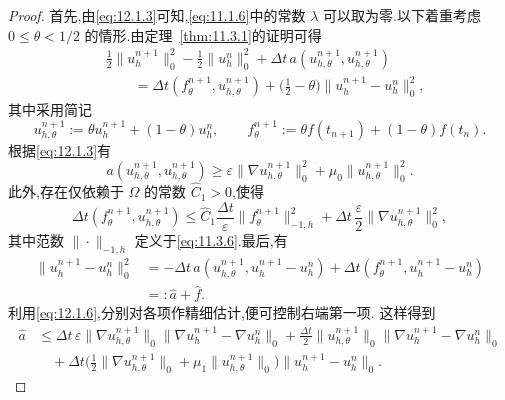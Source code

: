 \begin{proof}
首先,由\eqref{eq:12.1.3}可知,\eqref{eq:11.1.6}中的常数 \(\lambda\) 可以取为零.以下着重考虑 \(0\le\theta<1/2\) 的情形.由定理~\ref{thm:11.3.1}的证明可得
\begin{equation}\label{eq:12.2.6}
  \begin{aligned}
    &\tfrac12\|u_h^{n+1}\|_0^2-\tfrac12\|u_h^n\|_0^2
      +\Delta t\,a(u_{h,\theta}^{n+1},u_{h,\theta}^{n+1})\\
    &\qquad=\Delta t(f_\theta^{n+1},u_{h,\theta}^{n+1})
      +\bigl(\tfrac12-\theta\bigr)\|u_h^{n+1}-u_h^n\|_0^2,
  \end{aligned}
\end{equation}
其中采用简记
\[
  u_{h,\theta}^{n+1}:=\theta u_h^{n+1}+(1-\theta)u_h^n,\qquad
  f_\theta^{n+1}:=\theta f(t_{n+1})+(1-\theta)f(t_n).
\]
根据\eqref{eq:12.1.3}有
\begin{equation}\label{eq:12.2.7}
  a(u_{h,\theta}^{n+1},u_{h,\theta}^{n+1})
    \ge\varepsilon\|\nabla u_{h,\theta}^{n+1}\|_0^2
      +\mu_0\|u_{h,\theta}^{n+1}\|_0^2.
\end{equation}
此外,存在仅依赖于 \(\Omega\) 的常数 \(\widehat C_1>0\),使得
\begin{equation}\label{eq:12.2.8}
  \Delta t(f_\theta^{n+1},u_{h,\theta}^{n+1})
    \le\widehat C_1\frac{\Delta t}{\varepsilon}\|f_\theta^{n+1}\|_{-1,h}^2
      +\Delta t\,\frac{\varepsilon}{2}\|\nabla u_{h,\theta}^{n+1}\|_0^2,
\end{equation}
其中范数 \(\|\cdot\|_{-1,h}\) 定义于\eqref{eq:11.3.6}.最后,有
\begin{equation}\label{eq:12.2.9}
  \begin{aligned}
    \|u_h^{n+1}-u_h^n\|_0^2
      &=-\Delta t\,a(u_{h,\theta}^{n+1},u_h^{n+1}-u_h^n)
        +\Delta t(f_\theta^{n+1},u_h^{n+1}-u_h^n)\\
      &=:\widehat a+\widehat f.
  \end{aligned}
\end{equation}
利用\eqref{eq:12.1.6},分别对各项作精细估计,便可控制右端第一项.
这样得到
\[
  \begin{aligned}
    \widehat a
      &\le\Delta t\,\varepsilon\|\nabla u_{h,\theta}^{n+1}\|_0
          \|\nabla u_h^{n+1}-\nabla u_h^n\|_0
        +\frac{\Delta t}{2}\|u_{h,\theta}^{n+1}\|_0
          \|\nabla u_h^{n+1}-\nabla u_h^n\|_0\\
      &\quad+\Delta t\bigl(\tfrac12\|\nabla u_{h,\theta}^{n+1}\|_0
          +\mu_1\|u_{h,\theta}^{n+1}\|_0\bigr)\|u_h^{n+1}-u_h^n\|_0.
  \end{aligned}
\]
\end{proof}
